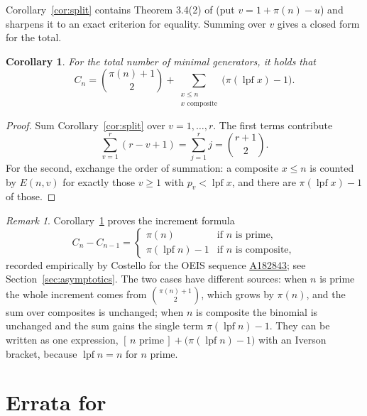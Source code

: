 \documentclass[a4paper,11pt,oneside,reqno]{amsart}
\theoremstyle{definition}
\theoremstyle{remark}
\newtheorem{remark}[definition]{Remark}
\theoremstyle{plain}
\newtheorem{corollary}[definition]{Corollary}
\newcommand{\lpf}{\operatorname{lpf}}
\newcommand{\seqnum}[1]{\href{https://oeis.org/#1}{\underline{#1}}}
\begin{document}
Corollary~\ref{cor:split} contains Theorem 3.4(2) of \cite{Snellman2000} (put
\(v = 1+\pi(n)-u\)) and sharpens it to an exact criterion for equality. Summing over
\(v\) gives a closed form for the total.

\begin{corollary}\label{cor:total}
  For the total number of minimal generators, it holds that
  \begin{equation}\label{eq:Cntotal}
    C_n = \binom{\pi(n)+1}{2}+\sum_{\substack{x \le n\\ x\text{ composite}}}
        \bigl(\pi(\lpf x)-1\bigr).
  \end{equation}
\end{corollary}

\begin{proof}
  Sum Corollary~\ref{cor:split} over \(v = 1,\dots,r\). The first terms contribute
  \[
    \sum_{v = 1}^{r}(r-v+1) = \sum_{j = 1}^{r}j = \binom{r+1}{2}.
  \]
  For the second, exchange the order of summation: a composite \(x \le n\) is counted by \(E(n,v)\) for exactly those
  \(v \ge 1\) with \(p_v < \lpf x\), and there are \(\pi(\lpf x)-1\) of those.
\end{proof}

\begin{remark}
  Corollary~\ref{cor:total} proves the increment formula
  \[
    C_n-C_{n-1}=
    \begin{cases}
      \pi(n) & \text{if \(n\) is prime},\\[2pt]
      \pi(\lpf n)-1 & \text{if \(n\) is composite},
    \end{cases}
  \]
  recorded empirically by Costello for the OEIS sequence \seqnum{A182843}; see
  Section~\ref{sec:asymptotics}. The two cases have different sources: when
  \(n\) is prime the whole increment comes from \(\binom{\pi(n)+1}{2}\), which
  grows by \(\pi(n)\), and the sum over composites is unchanged; when \(n\) is
  composite the binomial is unchanged and the sum gains the single term
  \(\pi(\lpf n)-1\). They can be written as one expression,
  \([\,n\text{ prime}\,]+\bigl(\pi(\lpf n)-1\bigr)\) with an Iverson bracket,
  because \(\lpf n = n\) for \(n\) prime.
\end{remark}

\section{Errata for \texorpdfstring{\cite{Snellman2000}}{[Sne00]}}\label{sec:errata}
\end{document}
